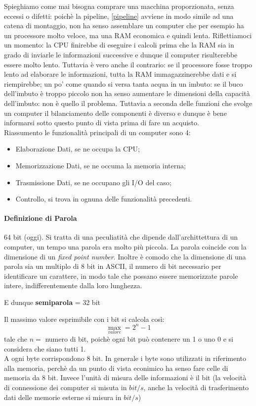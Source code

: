 \documentclass{article}
\begin{document}
Spieghiamo come mai bisogna comprare una macchina proporzionata, senza eccessi o difetti:
poichè la pipeline, \autoref{pipeline} avviene in modo simile ad una catena di montaggio, non ha senso assemblare un computer che per esempio ha un processore molto veloce, ma una RAM economica e quindi lenta. Riflettiamoci un momento: la CPU finirebbe di eseguire i calcoli prima che la RAM sia in grado di inviarle le informazioni successive e dunque il computer risulterebbe essere molto lento.
Tuttavia è vero anche il contrario: se il processore fosse troppo lento ad elaborare le informazioni, tutta la RAM immagazzinerebbe dati e si riempirebbe; un po' come quando si versa tanta acqua in un imbuto: se il buco dell'imbuto è troppo piccolo non ha senso aumentare le dimensioni della capacità dell'imbuto: non è quello il problema. Tuttavia a seconda delle funzioni che svolge un computer il bilanciamento delle componenti è diverso e dunque è bene informarsi sotto questo punto di vista prima di fare un acquisto.\\

Riassumento le funzionalità principali di un computer sono 4:
\begin{itemize}
	\item Elaborazione Dati, se ne occupa la CPU;
	\item Memorizzazione Dati, se ne occuma la memoria interna;
	\item Trasmissione Dati, se ne occupano gli I/O del caso;
	\item Controllo, si trova in ognuna delle funzionalità precedenti.
\end{itemize}

\paragraph{Definizione di Parola} \label{parola} 64 bit (oggi). Si tratta di una peculiatità che dipende dall'archittettura di un computer, un tempo una parola era molto più piccola. La parola coincide con la dimensione di un \textit{fixed point number}. Inoltre è comodo che la dimensione di una parola sia un multiplo di 8 bit in ASCII, il numero di bit necessario per identificare un carattere, in modo tale che possano essere memorizzate parole intere, indifferentemente dalla loro lunghezza.

E dunque \textbf{semiparola} = 32 bit

Il massimo valore esprimibile con i bit si calcola così:
\begin{equation} \label{valoremassimo}
	\max_{valore}= 2^n-1
\end{equation}
tale che $n=$ numero di bit, poichè ogni bit può contenere un 1 o uno 0 e si considera che siano tutti 1. \\
\noindent A ogni byte corrispondono 8 bit. In generale i byte sono utilizzati in riferimento alla memoria, perchè da un punto di vista econimico ha senso fare celle di memoria da 8 bit. Invece l'unità di misura delle informazioni è il bit (la velocità di connessione dei computer si misuta in $bit/s$, anche la velocità di trasferimento dati delle memorie esterne si misura in $bit/s$)
\newline
\end{document}
